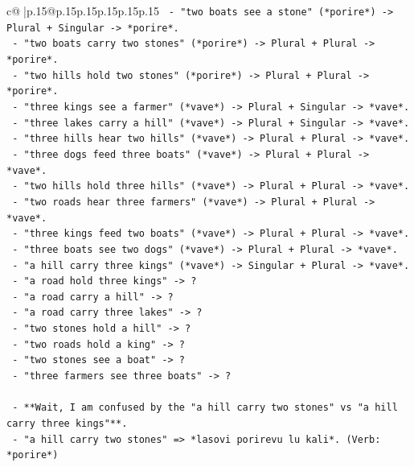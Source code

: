 \documentclass{article}
\begin{document}
{\begin{supertabular}{c@{$\;$}|p{.15\linewidth}@{}p{.15\linewidth}p{.15\linewidth}p{.15\linewidth}p{.15\linewidth}p{.15\linewidth}}
{{{\texttt{         {-} "two boats see a stone" (*porire*) {-}> Plural + Singular {-}> *porire*.} \\
\texttt{         {-} "two boats carry two stones" (*porire*) {-}> Plural + Plural {-}> *porire*.} \\
\texttt{         {-} "two hills hold two stones" (*porire*) {-}> Plural + Plural {-}> *porire*.} \\
\texttt{         {-} "three kings see a farmer" (*vave*) {-}> Plural + Singular {-}> *vave*.} \\
\texttt{         {-} "three lakes carry a hill" (*vave*) {-}> Plural + Singular {-}> *vave*.} \\
\texttt{         {-} "three hills hear two hills" (*vave*) {-}> Plural + Plural {-}> *vave*.} \\
\texttt{         {-} "three dogs feed three boats" (*vave*) {-}> Plural + Plural {-}> *vave*.} \\
\texttt{         {-} "two hills hold three hills" (*vave*) {-}> Plural + Plural {-}> *vave*.} \\
\texttt{         {-} "two roads hear three farmers" (*vave*) {-}> Plural + Plural {-}> *vave*.} \\
\texttt{         {-} "three kings feed two boats" (*vave*) {-}> Plural + Plural {-}> *vave*.} \\
\texttt{         {-} "three boats see two dogs" (*vave*) {-}> Plural + Plural {-}> *vave*.} \\
\texttt{         {-} "a hill carry three kings" (*vave*) {-}> Singular + Plural {-}> *vave*.} \\
\texttt{         {-} "a road hold three kings" {-}> ?} \\
\texttt{         {-} "a road carry a hill" {-}> ?} \\
\texttt{         {-} "a road carry three lakes" {-}> ?} \\
\texttt{         {-} "two stones hold a hill" {-}> ?} \\
\texttt{         {-} "two roads hold a king" {-}> ?} \\
\texttt{         {-} "two stones see a boat" {-}> ?} \\
\texttt{         {-} "three farmers see three boats" {-}> ?} \\
\\ 
\texttt{   {-} **Wait, I am confused by the "a hill carry two stones" vs "a hill carry three kings"**.} \\
\texttt{     {-} "a hill carry two stones" => *lasovi porirevu lu kali*. (Verb: *porire*)} \\
}}}
\end{supertabular}}
\end{document}
